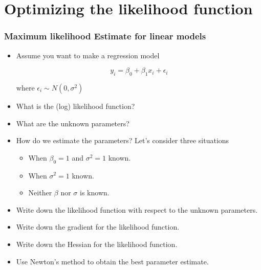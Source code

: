 \documentclass[10pt]{beamer}
\begin{document}
\section{Optimizing the likelihood function}


\begin{frame}
  \frametitle{Maximum likelihood Estimate for linear models}

  \begin{itemize}
  \item Assume you want to make a regression model

    \begin{equation*}
      y_i = \beta_0 + \beta_1 x_i + \epsilon_i
    \end{equation*}

    where $\epsilon_i \sim N(0, \sigma^2)$

  \item What is the (log) likelihood function?

  \item What are the unknown parameters?

  \item How do we estimate the parameters? Let's consider three situations


    \begin{itemize}
    \item When $\beta_0=1$ and $\sigma^2=1$ known.
    \item When $\sigma^2=1$ known.
    \item Neither $\beta$ nor $\sigma$ is known.
    \end{itemize}

    \item Write down the likelihood function with respect to the
      unknown parameters.

    \item Write down the gradient for the likelihood function.

    \item Write down the Hessian for the likelihood function.

    \item Use Newton's method to obtain the best parameter estimate.

  \end{itemize}

\end{frame}
\end{document}
